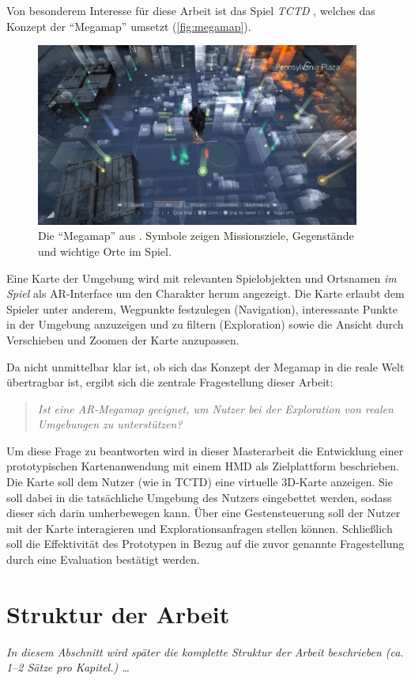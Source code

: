 Von besonderem Interesse für diese Arbeit ist das Spiel \emph{\gls{TCTD}} \parencite{Ubisoft2018}, welches das Konzept der \enquote{Megamap} umsetzt (\autoref{fig:megamap}).
\begin{figure}[h]
	\centering
	\includegraphics[width=0.95\textwidth]{figures/the_division_megamap.jpg}
	\caption{Die \enquote{Megamap} aus \emph{}. Symbole zeigen Missionsziele, Gegenstände und wichtige Orte im Spiel. }
	\label{fig:megamap}
\end{figure}
Eine Karte der Umgebung wird mit relevanten Spielobjekten und Ortsnamen \emph{im Spiel} als \gls{AR}-Interface um den Charakter herum angezeigt.
Die Karte erlaubt dem Spieler unter anderem, Wegpunkte festzulegen (Navigation), interessante Punkte in der Umgebung anzuzeigen und zu filtern (Exploration) sowie die Ansicht durch Verschieben und Zoomen der Karte anzupassen.

Da nicht unmittelbar klar ist, ob sich das Konzept der Megamap in die reale Welt übertragbar ist, ergibt sich die zentrale Fragestellung dieser Arbeit:
\begin{quote}
\itshape
Ist eine \gls{AR}-Megamap geeignet, um Nutzer bei der Exploration von \emph{realen} Umgebungen zu unterstützen?
\end{quote}
Um diese Frage zu beantworten wird in dieser Masterarbeit die Entwicklung einer prototypischen Kartenanwendung mit einem \gls{HMD} als Zielplattform beschrieben.
Die Karte soll dem Nutzer (wie in \gls{TCTD}) eine virtuelle \gls{3D}-Karte anzeigen.
Sie soll dabei in die tatsächliche Umgebung des Nutzers eingebettet werden, sodass dieser sich darin umherbewegen kann.
Über eine Gestensteuerung soll der Nutzer mit der Karte interagieren und Explorationsanfragen stellen können.
Schließlich soll die Effektivität des Prototypen in Bezug auf die zuvor genannte Fragestellung durch eine Evaluation bestätigt werden.

\section{Struktur der Arbeit}
{\itshape In diesem Abschnitt wird später die komplette Struktur der Arbeit beschrieben (ca. 1--2 Sätze pro Kapitel.) \dots}

%
\cleardoublepage